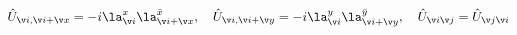 \begin{equation} 
\hat U_{\v i,\v i+{\v x}}=-i\la^{x}_{\v i}\la^{\bar x}_{\v i+{\v x}}, \ \ \
\hat U_{\v i,\v i+{\v y}}=-i\la^{y}_{\v i}\la^{\bar y}_{\v i+{\v y}} ,\ \ \
\hat U_{\v i\v j} =  \hat U_{\v j\v i}
\end{equation} 
